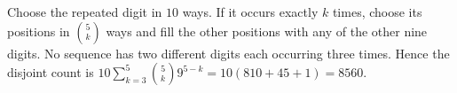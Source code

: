 Choose the repeated digit in $10$ ways. If it occurs exactly $k$ times, choose its positions in $\binom5k$ ways and fill the other positions with any of the other nine digits. No sequence has two different digits each occurring three times. Hence the disjoint count is $10\sum_{k=3}^5\binom5k9^{5-k}=10(810+45+1)=\boxed{8560}$.
